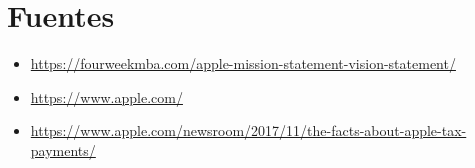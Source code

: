 \documentclass{article}
\begin{document}
\section{Fuentes}
\begin{itemize}
    \item \url{https://fourweekmba.com/apple-mission-statement-vision-statement/}
    \item \url{https://www.apple.com/}
    \item \url{https://www.apple.com/newsroom/2017/11/the-facts-about-apple-tax-payments/}
\end{itemize}
\end{document}
